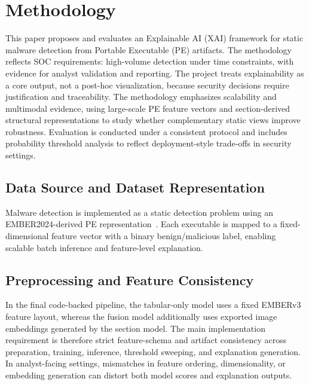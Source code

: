 \documentclass[conference]{IEEEtran}
\begin{document}
\section{Methodology}
\label{section:methodology}

This paper proposes and evaluates an Explainable AI (XAI) framework for static malware detection from Portable Executable (PE) artifacts.
The methodology reflects SOC requirements: high-volume detection under time constraints, with evidence for analyst validation and reporting.
The project treats explainability as a core output, not a post-hoc visualization, because security decisions require justification and traceability.
The methodology emphasizes scalability and multimodal evidence, using large-scale PE feature vectors and section-derived structural representations to study whether complementary static views improve robustness.
Evaluation is conducted under a consistent protocol and includes probability threshold analysis to reflect deployment-style trade-offs in security settings.

\subsection{Data Source and Dataset Representation}

Malware detection is implemented as a static detection problem using an EMBER2024-derived PE representation~\cite{JMGPR2024,ember2024github}.
Each executable is mapped to a fixed-dimensional feature vector with a binary benign/malicious label, enabling scalable batch inference and feature-level explanation.

\subsection{Preprocessing and Feature Consistency}

In the final code-backed pipeline, the tabular-only model uses a fixed EMBERv3 feature layout, whereas the fusion model additionally uses exported image embeddings generated by the section model.
The main implementation requirement is therefore strict feature-schema and artifact consistency across preparation, training, inference, threshold sweeping, and explanation generation.
In analyst-facing settings, mismatches in feature ordering, dimensionality, or embedding generation can distort both model scores and explanation outputs.
\end{document}
